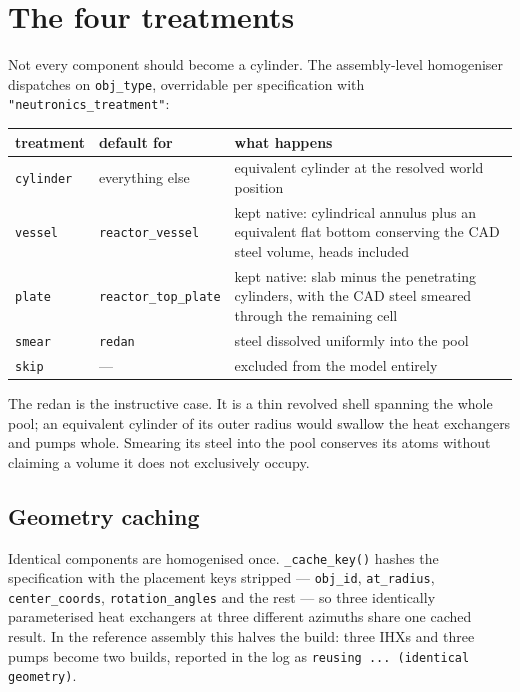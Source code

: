 \documentclass[9pt,a4paper]{extarticle}
\newcommand{\code}[1]{\texttt{\small #1}}
\begin{document}
\section{The four treatments}
\label{sec:treatments}

Not every component should become a cylinder. The assembly-level homogeniser
dispatches on \code{obj\_type}, overridable per specification with
\code{"neutronics\_treatment"}:

\begin{center}
\begin{tabular}{@{}llp{8.2cm}@{}}
\toprule
treatment & default for & what happens \\
\midrule
\code{cylinder} & everything else &
  equivalent cylinder at the resolved world position \\
\code{vessel} & \code{reactor\_vessel} &
  kept native: cylindrical annulus plus an equivalent flat bottom conserving the
  CAD steel volume, heads included \\
\code{plate} & \code{reactor\_top\_plate} &
  kept native: slab minus the penetrating cylinders, with the CAD steel smeared
  through the remaining cell \\
\code{smear} & \code{redan} &
  steel dissolved uniformly into the pool \\
\code{skip} & --- &
  excluded from the model entirely \\
\bottomrule
\end{tabular}
\end{center}

\noindent
The redan is the instructive case. It is a thin revolved shell spanning the
whole pool; an equivalent cylinder of its outer radius would swallow the heat
exchangers and pumps whole. Smearing its steel into the pool conserves its atoms
without claiming a volume it does not exclusively occupy.

\subsection{Geometry caching}

Identical components are homogenised once. \code{\_cache\_key()} hashes the
specification with the placement keys stripped --- \code{obj\_id},
\code{at\_radius}, \code{center\_coords}, \code{rotation\_angles} and the rest
--- so three identically parameterised heat exchangers at three different
azimuths share one cached result. In the reference assembly this halves the
build: three IHXs and three pumps become two builds, reported in the log as
\code{reusing ... (identical geometry)}.
\end{document}
